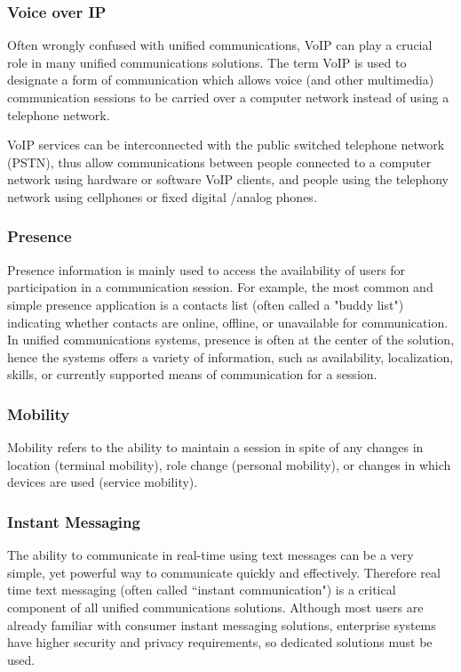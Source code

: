 \subsubsection{Voice over IP}
Often wrongly confused with unified communications, VoIP can play a crucial role in many unified communications solutions. The term VoIP is used to designate a form of communication which allows voice (and other multimedia)  communication sessions to be carried over a computer network instead of using a telephone network.

VoIP services can be interconnected with the public switched telephone network (PSTN), thus allow communications between people connected to a computer network using hardware or software VoIP clients, and people using the telephony network using cellphones or fixed digital /analog phones\cite{desantis_understanding_2008}.

\subsubsection{Presence}
Presence information is mainly used to access the availability of users for participation in a communication session. For example, the most common and simple presence application is a contacts list (often called a "buddy list") indicating whether contacts are online, offline, or unavailable for communication. In unified communications systems, presence is often at the center of the solution, hence the systems offers a variety of information, such as availability, localization, skills, or currently supported means of communication for a session\cite{peternel_using_2008}\cite{schulzrinne_simple_2006}. 

\subsubsection{Mobility}
Mobility refers to the ability to maintain a session in spite of any changes in location (terminal mobility), role change (personal mobility), or changes in which devices are used (service mobility)\cite{wang_mobility_2001}.

\subsubsection{Instant Messaging}
The ability to communicate in real-time using text messages can be a very simple, yet powerful way to communicate quickly and effectively. Therefore real time text messaging (often called ``instant communication") is a critical component of all unified communications solutions. Although most users are already familiar with consumer instant messaging solutions, enterprise systems have higher security and privacy requirements, so dedicated solutions must be used\cite{pleasant_what_2008}.

